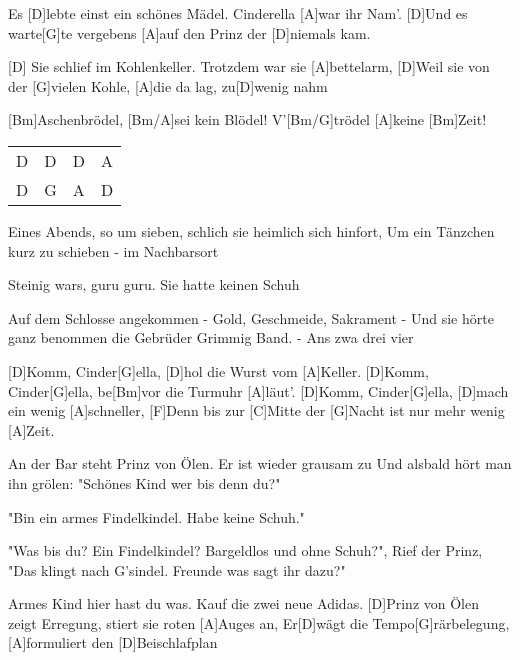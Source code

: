 \begin{spacing}{0.96}


\begin{guitar}
	Es [D]lebte einst ein schönes Mädel. Cinderella [A]war ihr Nam'.
	[D]Und es warte[G]te vergebens [A]auf den Prinz der [D]niemals kam.
	
	[D] Sie schlief im Kohlenkeller. Trotzdem war sie [A]bettelarm,
	[D]Weil sie von der [G]vielen Kohle, [A]die da lag, zu[D]wenig nahm
	
	[Bm]Aschenbrödel, [Bm/A]sei kein Blödel! V'[Bm/G]trödel [A]keine [Bm]Zeit!
	
	 {\footnotesize\begin{tabular}{l|l|l|l}
			D & D & D & A \\
			D & G & A & D 
	\end{tabular}}
	Eines Abends, so um sieben, schlich sie heimlich sich hinfort,
	Um ein Tänzchen kurz zu schieben - im Nachbarsort
	
	Steinig wars, guru guru. Sie hatte keinen Schuh
	
	Auf dem Schlosse angekommen - Gold, Geschmeide, Sakrament -
	Und sie hörte ganz benommen die Gebrüder Grimmig Band. 
	\hfill- Ans zwa drei vier
	\begin{highlightbar}
		[D]Komm, Cinder[G]ella, [D]hol die Wurst vom [A]Keller. 
		[D]Komm, Cinder[G]ella, be[Bm]vor die Turmuhr [A]läut'.
		[D]Komm, Cinder[G]ella, [D]mach ein wenig [A]schneller, 
		[F]Denn bis zur [C]Mitte der [G]Nacht ist nur mehr wenig [A]Zeit.
	\end{highlightbar}
	
	An der Bar steht Prinz von Ölen. Er ist wieder grausam zu
	Und alsbald hört man ihn grölen: "Schönes Kind wer bis denn du?"
	
	"Bin ein armes Findelkindel. Habe keine Schuh."
	
	"Was bis du? Ein Findelkindel? Bargeldlos und ohne Schuh?",
	Rief der Prinz, "Das klingt nach G'sindel. Freunde was sagt ihr dazu?"
	
	Armes Kind hier hast du was. Kauf die zwei neue Adidas.
	\pagebreak
	[D]Prinz von Ölen zeigt Erregung, stiert sie roten [A]Auges an,
	Er[D]wägt die Tempo[G]rärbelegung, [A]formuliert den [D]Beischlafplan
	

\end{guitar}
\end{spacing}
